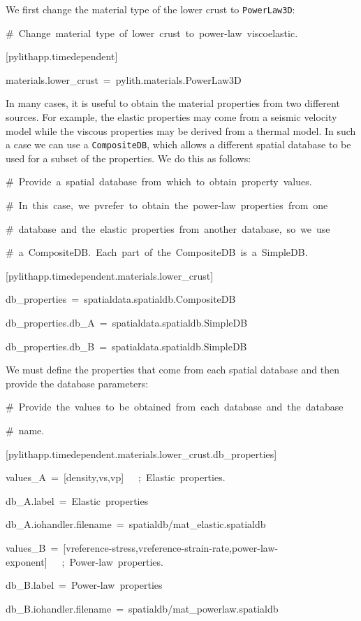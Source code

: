 We first change the material type of the lower crust to \texttt{PowerLaw3D}:
\begin{lyxcode}
\#~Change~material~type~of~lower~crust~to~power-law~viscoelastic.

{[}pylithapp.timedependent{]}

materials.lower\_crust~=~pylith.materials.PowerLaw3D
\end{lyxcode}
In many cases, it is useful to obtain the material properties from
two different sources. For example, the elastic properties may come
from a seismic velocity model while the viscous properties may be
derived from a thermal model. In such a case we can use a \texttt{CompositeDB},
which allows a different spatial database to be used for a subset
of the properties. We do this as follows:
\begin{lyxcode}
\#~Provide~a~spatial~database~from~which~to~obtain~property~values.

\#~In~this~case,~we~pvrefer~to~obtain~the~power-law~properties~from~one

\#~database~and~the~elastic~properties~from~another~database,~so~we~use

\#~a~CompositeDB.~Each~part~of~the~CompositeDB~is~a~SimpleDB.

{[}pylithapp.timedependent.materials.lower\_crust{]}

db\_properties~=~spatialdata.spatialdb.CompositeDB

db\_properties.db\_A~=~spatialdata.spatialdb.SimpleDB

db\_properties.db\_B~=~spatialdata.spatialdb.SimpleDB
\end{lyxcode}
We must define the properties that come from each spatial database
and then provide the database parameters:
\begin{lyxcode}
{\small{}\#~Provide~the~values~to~be~obtained~from~each~database~and~the~database}{\small \par}

{\small{}\#~name.}{\small \par}

{\small{}{[}pylithapp.timedependent.materials.lower\_crust.db\_properties{]}}{\small \par}

{\small{}values\_A~=~{[}density,vs,vp{]}~~~;~Elastic~properties.}{\small \par}

{\small{}db\_A.label~=~Elastic~properties}{\small \par}

{\small{}db\_A.iohandler.filename~=~spatialdb/mat\_elastic.spatialdb}{\small \par}

{\small{}values\_B~=~{[}vreference-stress,vreference-strain-rate,power-law-exponent{]}~~~;~Power-law~properties.}{\small \par}

{\small{}db\_B.label~=~Power-law~properties}{\small \par}

{\small{}db\_B.iohandler.filename~=~spatialdb/mat\_powerlaw.spatialdb}{\small \par}
\end{lyxcode}
